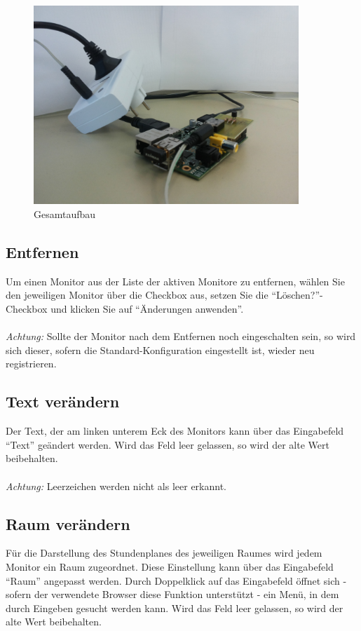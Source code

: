 \begin{figure}[H]
\centering
\includegraphics[keepaspectratio=true, width=10cm]{images/rpi/rpi_gesamt.jpg}
\caption{Gesamtaufbau}
\label{fig:report_hardware_Gesamt}
\end{figure}

\subsection{Entfernen}

Um einen Monitor aus der Liste der aktiven Monitore zu entfernen, wählen Sie den jeweiligen Monitor über die Checkbox aus, setzen Sie die \enquote{Löschen?}-Checkbox und klicken Sie auf \enquote{Änderungen anwenden}.\\
\\
\textit{Achtung:} Sollte der Monitor nach dem Entfernen noch eingeschalten sein, so wird sich dieser, sofern die Standard-Konfiguration eingestellt ist, wieder neu registrieren.

\subsection{Text verändern}

Der Text, der am linken unterem Eck des Monitors kann über das Eingabefeld \enquote{Text} geändert werden. Wird das Feld leer gelassen, so wird der alte Wert beibehalten.\\
\\
\textit{Achtung:} Leerzeichen werden nicht als leer erkannt.

\subsection{Raum verändern}

Für die Darstellung des Stundenplanes des jeweiligen Raumes wird jedem Monitor ein Raum zugeordnet. Diese Einstellung kann über das Eingabefeld \enquote{Raum} angepasst werden. Durch Doppelklick auf das Eingabefeld öffnet sich - sofern der verwendete Browser diese Funktion unterstützt - ein Menü, in dem durch Eingeben gesucht werden kann. Wird das Feld leer gelassen, so wird der alte Wert beibehalten.

